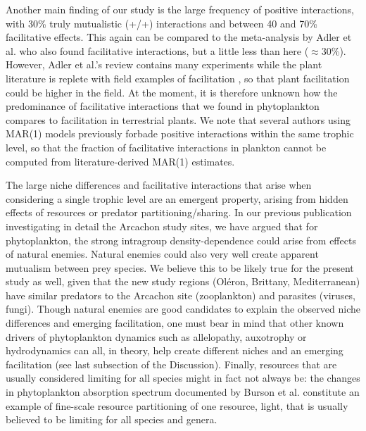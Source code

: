 \documentclass[9pt,twocolumn,twoside,lineno]{pnas-new}
\begin{document}
Another main finding of our study is the large frequency of positive
interactions, with 30\% truly mutualistic (+/+) interactions and between
40 and 70\% facilitative effects. This again can be compared to the
meta-analysis by Adler et al.\cite{adler_competition_2018} who
also found facilitative interactions, but a little less than here
($\approx$30\%). However, Adler et al.\cite{adler_competition_2018}'s
review contains many experiments while the plant literature is replete
with field examples of facilitation \cite{brooker_facilitation_2008,mcintire2014facilitation},
so that plant facilitation could be higher in the field. At the moment,
it is therefore unknown how the predominance of facilitative interactions
that we found in phytoplankton compares to facilitation in terrestrial
plants. We note that several authors using MAR(1) models previously
forbade positive interactions within the same trophic level, so that
the fraction of facilitative interactions in plankton cannot be computed
from literature-derived MAR(1) estimates.

The large niche differences and facilitative interactions that arise
when considering a single trophic level are an emergent property,
arising from hidden effects of resources or predator partitioning/sharing\cite{chesson_updates_2018}.
In our previous publication investigating in detail the Arcachon study
sites\cite{barraquand_coastal_2018}, we have argued that for
phytoplankton, the strong intragroup density-dependence could arise
from effects of natural enemies\cite{haydon_pivotal_1994,barraquand_coastal_2018}.
Natural enemies could also very well create apparent mutualism between
prey species\cite{abrams_apparent_1998,barraquand_indirect_2015,de_ruiter_emergent_2017}.
We believe this to be likely true for the present study as well, given
that the new study regions (Oléron, Brittany, Mediterranean) have
similar predators to the Arcachon site (zooplankton\cite{jamet_zooplankton_2001,moderan_zooplankton_2010,tortajada_network_2012})
and parasites (viruses\cite{ory_pelagic_2010}, fungi). Though
natural enemies are good candidates to explain the observed niche
differences and emerging facilitation, one must bear in mind that
other known drivers of phytoplankton dynamics such as allelopathy\cite{felpeto_allelopathy_2018},
auxotrophy\cite{tang_most_2010} or hydrodynamics\cite{levy_role_2018}
can all, in theory, help create different niches and an emerging facilitation
(see last subsection of the Discussion). Finally, resources that are
usually considered limiting for all species might in fact not always
be: the changes in phytoplankton absorption spectrum documented by
Burson et al.\cite{burson_competition_2018} constitute an example
of fine-scale resource partitioning of one resource, light, that is
usually believed to be limiting for all species and genera.
\end{document}
